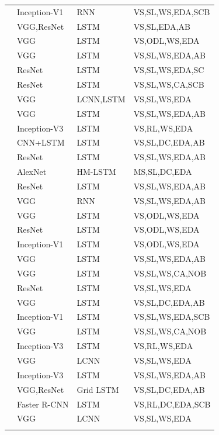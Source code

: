 \begin{longtable}{ p{} p{} p{} p{}}
    \citet{You2016} & Inception-V1 & RNN & VS,SL,WS,EDA,SCB\\
    \citet{Chen2017_SCA} & VGG,ResNet & LSTM & VS,SL,EDA,AB\\
    \citet{Dai2017_CGAN} & VGG & LSTM & VS,ODL,WS,EDA\\
    \citet{Fu2017} & VGG & LSTM & VS,SL,WS,EDA,AB\\
    \citet{Gan2017_Style} & ResNet & LSTM & VS,SL,WS,EDA,SC\\
    \citet{Gan2017_SCN} & ResNet & LSTM & VS,SL,WS,CA,SCB\\
    \citet{Gu2017} & VGG & LCNN,LSTM & VS,SL,WS,EDA\\
    \citet{Liu2017_SAM} & VGG & LSTM & VS,SL,WS,EDA,AB\\
    \citet{Liu2017_PG} & Inception-V3 & LSTM & VS,RL,WS,EDA\\
    \citet{Liu2017_MAT} & CNN+LSTM & LSTM & VS,SL,DC,EDA,AB\\
    \citet{Lu2017} & ResNet & LSTM & VS,SL,WS,EDA,AB\\
    \citet{Niu2017} & AlexNet & HM-LSTM & MS,SL,DC,EDA\\
    \citet{Park2017} & ResNet & LSTM & VS,SL,WS,EDA,AB\\
    \citet{Pedersoli2017} & VGG & RNN & VS,SL,WS,EDA,AB\\
    \citet{Ren2017} & VGG & LSTM & VS,ODL,WS,EDA\\
    \citet{Rennie2017} & ResNet & LSTM & VS,ODL,WS,EDA\\
    \citet{Shetty2017} & Inception-V1 & LSTM & VS,ODL,WS,EDA\\
    \citet{Tavakoliy2017} & VGG & LSTM & VS,SL,WS,EDA,AB\\
    \citet{Venugopalan2017} & VGG & LSTM & VS,SL,WS,CA,NOB\\
    \citet{Wang2017} & ResNet & LSTM & VS,SL,WS,EDA\\
    \citet{Yang2017} & VGG & LSTM & VS,SL,DC,EDA,AB\\
    \citet{Yao2017_Attr} & Inception-V1 & LSTM & VS,SL,WS,EDA,SCB\\
    \citet{Yao2017_NOB} & VGG & LSTM & VS,SL,WS,CA,NOB\\
    \citet{Zhang2017} & Inception-V3 & LSTM & VS,RL,WS,EDA\\
    \citet{Aneja2018} & VGG & LCNN & VS,SL,WS,EDA\\
    \citet{Jiang2018} & Inception-V3 & LSTM & VS,SL,WS,EDA,AB\\
    \citet{Khademi2018} & VGG,ResNet & Grid LSTM & VS,SL,DC,EDA,AB\\
    \citet{Li2018_VS-LSTM} & Faster R-CNN & LSTM & VS,RL,DC,EDA,SCB\\
    \citet{Wang2018} & VGG & LCNN & VS,SL,WS,EDA\\
    \bottomrule
\label{tab:classification}
\end{longtable}
\endgroup

